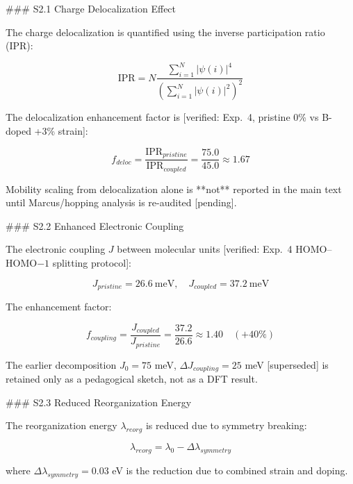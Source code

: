 ### S2.1 Charge Delocalization Effect

The charge delocalization is quantified using the inverse participation ratio (IPR):

\begin{equation}
\text{IPR} = N \frac{\sum_{i=1}^{N} |\psi(i)|^4}{\left(\sum_{i=1}^{N} |\psi(i)|^2\right)^2}
\label{eq:S2_IPR}
\end{equation}

The delocalization enhancement factor is [verified: Exp.~4, pristine 0\% vs B-doped +3\% strain]:

\begin{equation}
f_{deloc} = \frac{\text{IPR}_{pristine}}{\text{IPR}_{coupled}} = \frac{75.0}{45.0} \approx 1.67
\label{eq:S2_deloc_factor}
\end{equation}

Mobility scaling from delocalization alone is **not** reported in the main text until Marcus/hopping analysis is re-audited [pending].

### S2.2 Enhanced Electronic Coupling

The electronic coupling $J$ between molecular units [verified: Exp.~4 HOMO--HOMO$-1$ splitting protocol]:

\begin{equation}
J_{pristine} = 26.6~\text{meV}, \quad J_{coupled} = 37.2~\text{meV}
\label{eq:S2_coupling}
\end{equation}

The enhancement factor:

\begin{equation}
f_{coupling} = \frac{J_{coupled}}{J_{pristine}} = \frac{37.2}{26.6} \approx 1.40 \quad (+40\%)
\label{eq:S2_coupling_factor}
\end{equation}

The earlier decomposition $J_0=75$ meV, $\Delta J_{coupling}=25$ meV [superseded] is retained only as a pedagogical sketch, not as a DFT result.

### S2.3 Reduced Reorganization Energy

The reorganization energy $\lambda_{reorg}$ is reduced due to symmetry breaking:

\begin{equation}
\lambda_{reorg} = \lambda_0 - \Delta\lambda_{symmetry}
\label{eq:S2_reorg}
\end{equation}

where $\Delta\lambda_{symmetry} = 0.03$ eV is the reduction due to combined strain and doping.

